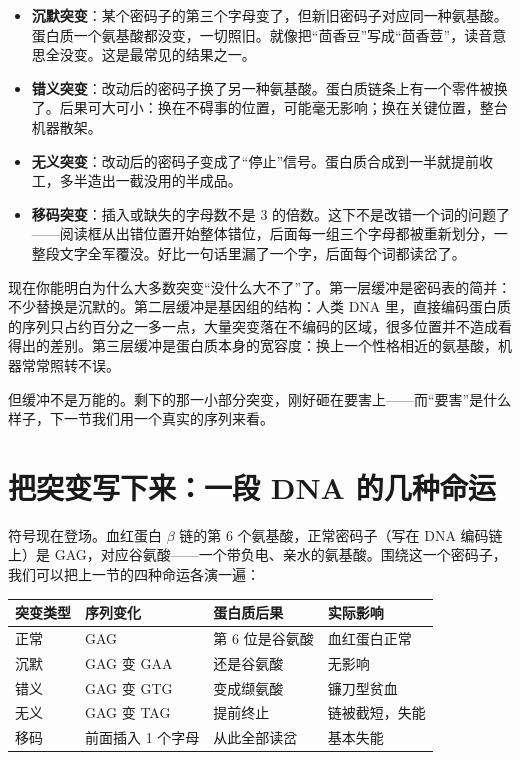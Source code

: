 \begin{itemize}[itemsep=2pt]
\item \textbf{沉默突变}：某个密码子的第三个字母变了，但新旧密码子对应同一种氨基酸。蛋白质一个氨基酸都没变，一切照旧。就像把“茴香豆”写成“茴香荳”，读音意思全没变。这是最常见的结果之一。
\item \textbf{错义突变}：改动后的密码子换了另一种氨基酸。蛋白质链条上有一个零件被换了。后果可大可小：换在不碍事的位置，可能毫无影响；换在关键位置，整台机器散架。
\item \textbf{无义突变}：改动后的密码子变成了“停止”信号。蛋白质合成到一半就提前收工，多半造出一截没用的半成品。
\item \textbf{移码突变}：插入或缺失的字母数不是 3 的倍数。这下不是改错一个词的问题了——阅读框从出错位置开始整体错位，后面每一组三个字母都被重新划分，一整段文字全军覆没。好比一句话里漏了一个字，后面每个词都读岔了。
\end{itemize}

现在你能明白为什么大多数突变“没什么大不了”了。第一层缓冲是密码表的简并：不少替换是沉默的。第二层缓冲是基因组的结构：人类 DNA 里，直接编码蛋白质的序列只占约百分之一多一点，大量突变落在不编码的区域，很多位置并不造成看得出的差别。第三层缓冲是蛋白质本身的宽容度：换上一个性格相近的氨基酸，机器常常照转不误。

但缓冲不是万能的。剩下的那一小部分突变，刚好砸在要害上——而“要害”是什么样子，下一节我们用一个真实的序列来看。

\section{把突变写下来：一段 DNA 的几种命运}

符号现在登场。血红蛋白 \(\beta\) 链的第 6 个氨基酸，正常密码子（写在 DNA 编码链上）是 GAG，对应谷氨酸——一个带负电、亲水的氨基酸。围绕这一个密码子，我们可以把上一节的四种命运各演一遍：

\begin{table}[htbp]
\centering
\begin{tabular}{llll}
\toprule
突变类型 & 序列变化 & 蛋白质后果 & 实际影响 \\
\midrule
正常 & GAG & 第 6 位是谷氨酸 & 血红蛋白正常 \\
沉默 & GAG 变 GAA & 还是谷氨酸 & 无影响 \\
错义 & GAG 变 GTG & 变成缬氨酸 & 镰刀型贫血 \\
无义 & GAG 变 TAG & 提前终止 & 链被截短，失能 \\
移码 & 前面插入 1 个字母 & 从此全部读岔 & 基本失能 \\
\bottomrule
\end{tabular}
\end{table}

